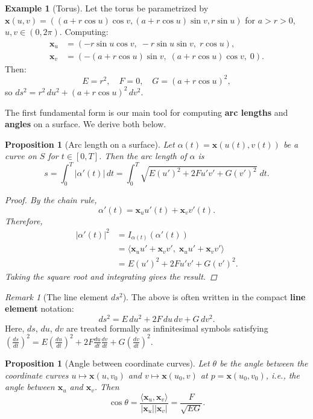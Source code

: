 \documentclass[10pt, a4paper]{article}
\theoremstyle{plain}
\newtheorem{proposition}[theorem]{Proposition}
\theoremstyle{definition}
\newtheorem{example}[theorem]{Example}
\theoremstyle{remark}
\newtheorem{remark}[theorem]{Remark}
\begin{document}
\begin{example}[Torus]
  Let the torus be parametrized by
  $\mathbf{x}(u, v) = ((a + r\cos u)\cos v, (a + r\cos u)\sin v, r\sin u)$
  for $a > r > 0$, $u, v \in (0, 2\pi)$. Computing:
  \begin{align*}
    \mathbf{x}_u &= (-r\sin u \cos v,\; -r\sin u \sin v,\; r\cos u), \\
    \mathbf{x}_v &= (-(a + r\cos u)\sin v,\; (a + r\cos u)\cos v,\; 0).
  \end{align*}
  Then:
  \[
    E = r^2, \quad F = 0, \quad G = (a + r\cos u)^2,
  \]
  so $ds^2 = r^2\,du^2 + (a + r\cos u)^2\,dv^2$.
\end{example}



The first fundamental form is our main tool for computing \textbf{arc lengths} and
\textbf{angles} on a surface. We derive both below.

\begin{proposition}[Arc length on a surface]
  Let $\alpha(t) = \mathbf{x}(u(t), v(t))$ be a curve on $S$ for $t \in [0, T]$.
  Then the arc length of $\alpha$ is
  \[
    s = \int_0^T |\alpha'(t)|\, dt
    = \int_0^T \sqrt{E(u')^2 + 2Fu'v' + G(v')^2}\; dt.
  \]

  \begin{proof}
    By the chain rule,
    \[
      \alpha'(t) = \mathbf{x}_u u'(t) + \mathbf{x}_v v'(t).
    \]
    Therefore,
    \begin{align*}
      |\alpha'(t)|^2
      &= I_{\alpha(t)}(\alpha'(t)) \\
      &= \langle \mathbf{x}_u u' + \mathbf{x}_v v',\; \mathbf{x}_u u' + \mathbf{x}_v v' \rangle \\
      &= E(u')^2 + 2Fu'v' + G(v')^2.
    \end{align*}
    Taking the square root and integrating gives the result.
  \end{proof}
\end{proposition}

\begin{remark}[The line element $ds^2$]
  The above is often written in the compact \textbf{line element} notation:
  \[
    ds^2 = E\, du^2 + 2F\, du\, dv + G\, dv^2.
  \]
  Here, $ds$, $du$, $dv$ are treated formally as infinitesimal symbols satisfying
  $\left(\frac{ds}{dt}\right)^2 = E\left(\frac{du}{dt}\right)^2
  + 2F\frac{du}{dt}\frac{dv}{dt} + G\left(\frac{dv}{dt}\right)^2$.
\end{remark}

\begin{proposition}[Angle between coordinate curves]
  Let $\theta$ be the angle between the coordinate curves $u \mapsto \mathbf{x}(u, v_0)$
  and $v \mapsto \mathbf{x}(u_0, v)$ at $p = \mathbf{x}(u_0, v_0)$, i.e., the angle
  between $\mathbf{x}_u$ and $\mathbf{x}_v$. Then
  \[
    \cos\theta = \frac{\langle \mathbf{x}_u, \mathbf{x}_v \rangle}{|\mathbf{x}_u||\mathbf{x}_v|}
    = \frac{F}{\sqrt{EG}}.
  \]
\end{proposition}
\end{document}
